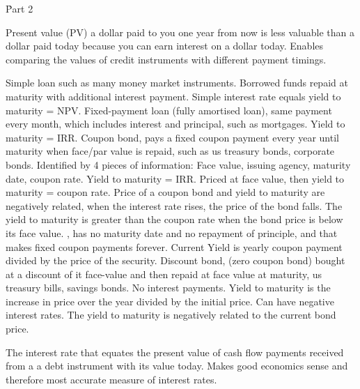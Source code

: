 \documentclass[12pt]{examnotes}
\begin{document}
\h{Part 2}


\ra Present value (PV) a dollar paid to you one year from now is less valuable than a dollar paid today because you can earn interest on a dollar today. Enables comparing the values of credit instruments with different payment timings.

 Simple loan such as many money market instruments.  Borrowed funds repaid at maturity with additional interest payment. 
\rna Simple interest rate equals yield to maturity = NPV.
 Fixed-payment loan (fully amortised loan), same payment every month, which includes interest and principal, such as mortgages. 
\rna Yield to maturity = IRR.
 Coupon bond, pays a fixed coupon payment every year until maturity when face/par value is repaid, such as us treasury bonds, corporate bonds. Identified by 4 pieces of information: Face value, issuing agency, maturity date, coupon rate. Yield to maturity = IRR. 
\rna Priced at face value, then yield to maturity = coupon rate.
\rna Price of a coupon bond and yield to maturity are negatively related, when the interest rate rises, the price of the bond falls. 
\rna The yield to  maturity is greater than the coupon rate when the bond price is below its face value. 
, has no maturity date and no repayment of principle, and that makes fixed coupon payments forever.
\rna Current Yield is yearly coupon payment divided by the price of the security.
 Discount bond, (zero coupon bond) bought at a discount of it face-value and then repaid at face value at maturity, us treasury bills, savings bonds. No interest payments.  
\rna Yield to maturity is the increase in price over the year divided by the initial price.
\rna Can have negative interest rates.
\rna The yield to maturity is negatively related to the current bond price.

\ra The interest rate that equates the present value of cash flow payments received from a a debt instrument with its value today.
\ra Makes good economics sense and therefore most accurate measure of interest rates.
\end{document}
